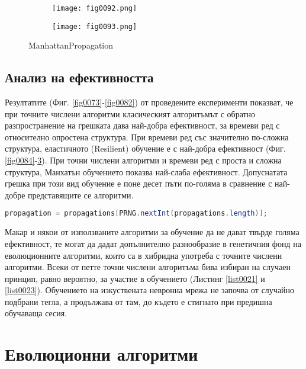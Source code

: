 \begin{figure}[H]
  \begin{subfigure}{0.49\textwidth}
  \texttt{[image: fig0092.png]}
  \label{fig0092}
  \end{subfigure}
  \begin{subfigure}{0.49\textwidth}
  \texttt{[image: fig0093.png]}
  \label{fig0093}
  \end{subfigure}
  \caption{ManhattanPropagation}
\end{figure}

\subsection{Анализ на ефективността}

Резултатите (Фиг. \ref{fig0073}-\ref{fig0082}) от проведените експерименти показват, че при точните числени алгоритми класическият алгоритъмът с обратно разпространение на грешката дава най-добра ефективност, за времеви ред с относително опростена структура. При времеви ред със значително по-сложна структура, еластичното (Resilient) обучение е с най-добра ефективност (Фиг. \ref{fig0084}-\ref{fig0093}). При точни числени алгоритми и времеви ред с проста и сложна структура, Манхатън обучението показва най-слаба ефективност. Допуснатата грешка при този вид обучение е поне десет пъти по-голяма в сравнение с най-добре представящите се алгоритми. 

\begin{lstlisting}[caption=Случаен избор на точните числени алгоритми, language=Java, basicstyle=\tiny, label=list0023]
propagation = propagations[PRNG.nextInt(propagations.length)];
\end{lstlisting}

Макар и някои от използваните алгоритми за обучение да не дават твърде голяма ефективност, те могат да дадат допълнително разнообразие в генетичния фонд на еволюционните алгоритми, които са в хибридна употреба с точните числени алгоритми. Всеки от петте точни числени алгоритъма бива избиран на случаен принцип, равно вероятно, за участие в обучението (Листинг \ref{list0021} и \ref{list0023}). Обучението на изкуствената невронна мрежа не започва от случайно подбрани тегла, а продължава от там, до където е стигнато при предишна обучаваща сесия. 

\section{Еволюционни алгоритми}

